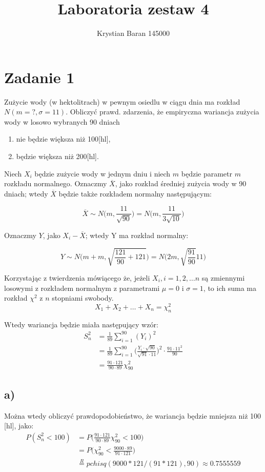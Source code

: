 \documentclass{article}
\author{Krystian Baran 145000}
\title{Laboratoria zestaw 4}
\begin{document}
\maketitle
\newpage


\section{Zadanie 1}
Zużycie wody (w hektolitrach) w pewnym osiedlu w ciągu
dnia ma rozkład $N(m = ? , \sigma = 11)$. Obliczyć prawd. zdarzenia, że empiryczna wariancja zużycia wody w losowo wybranych 90 dniach
\begin{enumerate}[label = \alph*)]
\item nie będzie większa niż 100[hl],
\item będzie większa niż 200[hl].
\end{enumerate}

Niech $X_i$ będzie zużycie wody w jednym dniu i niech $m$ będzie parametr $m$ rozkładu normalnego. Oznaczmy $\overline{X}$, jako rozkład średniej zużycia wody w 90 dniach; wtedy $\overline X$ będzie także rozkładem normalny następującym:

\[
\overline X \sim N \Big(m,\frac{11}{\sqrt{90}} \Big) = N\Big(m, \frac{11}{3\sqrt{10}}\Big)
\]

Oznaczmy $Y$, jako $X_i - \overline X$; wtedy Y ma rozkład normalny:

\[
Y \sim N \Big( m + m, \sqrt{\frac{121}{90} + 121} \Big) = N \Big( 2m, \sqrt{\frac{91}{90}}11 \Big)
\]

Korzystając z twierdzenia mówiącego że, jeżeli $X_i, i=1,2,\dots n$ są zmiennymi losowymi z rozkładem normalnym z parametrami $\mu = 0$ i $\sigma=1$, to ich suma ma rozkład $\chi^2$ z $n$ stopniami swobody.
$$ X_1+X_2+\dots+X_n = \chi_n^2$$

Wtedy wariancja będzie miała następujący wzór:
\begin{align*}
S_n^2 & = \frac{1}{89} \sum_{i=1}^{90}(Y_i)^2 \\
& = \frac{1}{89} \sum_{i=1}^{90} \Big( \frac{Y_i\cdot\sqrt{90}}{\sqrt{91}\cdot11} \Big)^2 \cdot \frac{91\cdot11^2}{90} \\
& = \frac{91\cdot 121}{90\cdot 89} \chi_{90}^2
\end{align*}

\subsection*{a)}
Można wtedy obliczyć prawdopodobieństwo, że wariancja będzie mniejsza niż 100 [hl], jako:
\begin{align*}
P(S_n^2 < 100) & = P\Big( \frac{91\cdot 121}{90\cdot 89} \chi_{90}^2 < 100 \Big) \\
& = P\Big( \chi_{90}^2 < \frac{9000\cdot 89}{91\cdot 121} \Big) \\
& \overset{R}{=} pchisq(9000*121/(91*121), 90) \approx 0.7555559
\end{align*}
\end{document}
